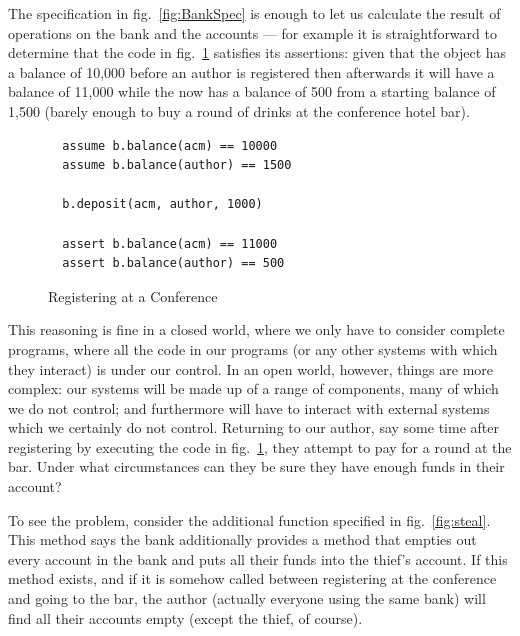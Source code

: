 


The specification in fig.~\ref{fig:BankSpec} is enough to let us
calculate the result of operations on the bank and the accounts ---
for example it is straightforward to determine that the code in
fig.~\ref{fig:rego} satisfies its assertions: given that the
 object has a balance of 10,000 before an author is
registered then afterwards it will have a balance of 11,000 while the
 now has a balance of 500 from a starting balance of 1,500
(barely enough to buy a round of drinks at the conference hotel bar).


\begin{figure}[tbp]
\begin{lstlisting}
  assume b.balance(acm) == 10000
  assume b.balance(author) == 1500

  b.deposit(acm, author, 1000)

  assert b.balance(acm) == 11000
  assert b.balance(author) == 500
\end{lstlisting}
\caption{Registering at a Conference}
\label{fig:rego}
\end{figure}


This reasoning is fine in a closed world, where we only have to
consider complete programs, where all the code in our programs (or any
other systems with which they interact) is under our control.   In an
open world, however, things are more complex: our systems will be made
up of a range of components, many of which we do not control; and
furthermore will have to interact with external systems which we
certainly do not control.  Returning to our author, say some time
after registering by executing the code in fig.~\ref{fig:rego}, they
attempt to pay for a round at the bar.  Under what circumstances can
they be sure they have enough funds in their account?

To see the problem, consider the additional function specified in
fig.~\ref{fig:steal}. This method says the bank additionally provides a
 method that empties out every account in the bank and puts
all their funds into the thief's account. If this method exists, and
if it is somehow called between registering at the conference and
going to the bar, the author (actually everyone using the same bank)
will find all their accounts empty (except the thief, of course).

